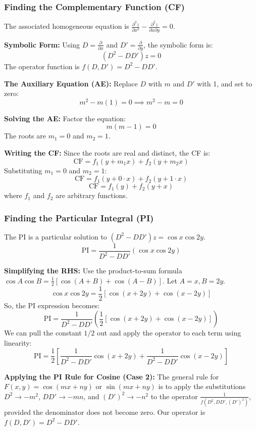 \documentclass{article}
\theoremstyle{remark}
\begin{document}
	\subsubsection{Finding the Complementary Function (CF)}
	The associated homogeneous equation is $\frac{\partial^2 z}{\partial x^2} - \frac{\partial^2 z}{\partial x \partial y} = 0$.
	
	\textbf{Symbolic Form:} Using $D = \frac{\partial}{\partial x}$ and $D' = \frac{\partial}{\partial y}$, the symbolic form is:
	\[
	(D^2 - DD')z = 0
	\]
	The operator function is $f(D, D') = D^2 - DD'$.
	
	\textbf{The Auxiliary Equation (AE):} Replace $D$ with $m$ and $D'$ with 1, and set to zero:
	\[
	m^2 - m(1) = 0 \implies m^2 - m = 0
	\]
	
	\textbf{Solving the AE:} Factor the equation:
	\[
	m(m-1) = 0
	\]
	The roots are $m_1 = 0$ and $m_2 = 1$.
	
	\textbf{Writing the CF:} Since the roots are real and distinct, the CF is:
	\[
	\text{CF} = f_1(y + m_1 x) + f_2(y + m_2 x)
	\]
	Substituting $m_1=0$ and $m_2=1$:
	\[
	\text{CF} = f_1(y + 0 \cdot x) + f_2(y + 1 \cdot x)
	\]
	\[
	\boxed{\text{CF} = f_1(y) + f_2(y+x)}
	\]
	where $f_1$ and $f_2$ are arbitrary functions.
	
	\subsubsection{Finding the Particular Integral (PI)}
	The PI is a particular solution to $(D^2 - DD')z = \cos x \cos 2y$.
	\[
	\text{PI} = \frac{1}{D^2 - DD'} (\cos x \cos 2y)
	\]
	
	\textbf{Simplifying the RHS:} Use the product-to-sum formula $\cos A \cos B = \frac{1}{2} [\cos(A+B) + \cos(A-B)]$. Let $A=x, B=2y$.
	\[
	\cos x \cos 2y = \frac{1}{2} [\cos(x+2y) + \cos(x-2y)]
	\]
	So, the PI expression becomes:
	\[
	\text{PI} = \frac{1}{D^2 - DD'} \left( \frac{1}{2} [\cos(x+2y) + \cos(x-2y)] \right)
	\]
	We can pull the constant $1/2$ out and apply the operator to each term using linearity:
	\[
	\text{PI} = \frac{1}{2} \left[ \frac{1}{D^2 - DD'} \cos(x+2y) + \frac{1}{D^2 - DD'} \cos(x-2y) \right]
	\]
	
	\textbf{Applying the PI Rule for Cosine (Case 2):}
	The general rule for $F(x,y) = \cos(mx+ny)$ or $\sin(mx+ny)$ is to apply the substitutions $D^2 \rightarrow -m^2$, $DD' \rightarrow -mn$, and $(D')^2 \rightarrow -n^2$ to the operator $\frac{1}{f(D^2, DD', (D')^2)}$, provided the denominator does not become zero. Our operator is $f(D,D') = D^2 - DD'$.
	
\end{document}
